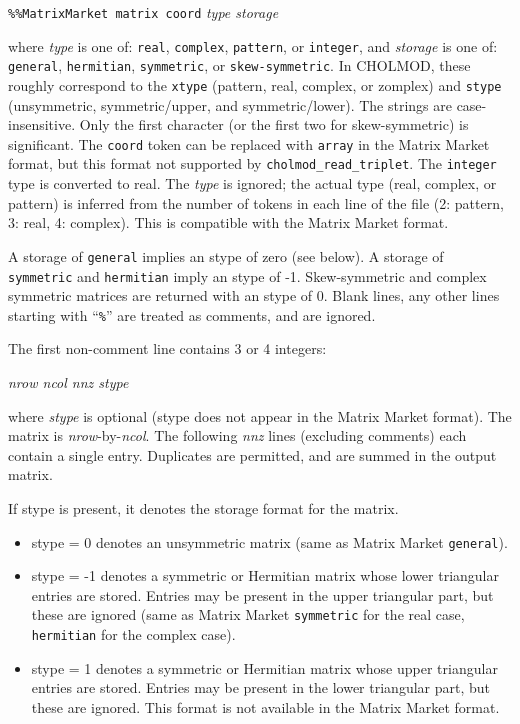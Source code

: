 \documentclass[11pt]{article}
\begin{document}
        {\tt \%\%MatrixMarket matrix coord} {\em type storage}

\vspace{0.1in}
\noindent
where {\em type} is one of: {\tt real}, {\tt complex}, {\tt pattern},
or {\tt integer}, and {\em storage} is one of: {\tt general}, {\tt hermitian},
{\tt symmetric}, or {\tt skew-symmetric}.
In CHOLMOD, these roughly correspond to the {\tt xtype}
(pattern, real, complex, or zomplex) and {\tt stype}
(unsymmetric, symmetric/upper, and symmetric/lower).
The strings are case-insensitive.  Only the first character (or the
first two for skew-symmetric) is significant.
The {\tt coord} token can be replaced with {\tt array} in the Matrix Market format, but
this format not supported by {\tt cholmod\_read\_triplet}.
The {\tt integer} type is converted to real.
The {\em type} is ignored; the actual type (real, complex, or pattern) is
inferred from the number of tokens in each line of the file (2: pattern,
3: real, 4: complex).  This is compatible with the Matrix Market format.

A storage of {\tt general} implies an stype of zero
(see below).  A storage of {\tt symmetric} and {\tt hermitian} imply an stype of -1.
Skew-symmetric and complex symmetric matrices are returned with an stype of 0.
Blank lines, any other lines starting with ``{\tt \%}'' are treated as comments, and are ignored.

The first non-comment line contains 3 or 4 integers:
\vspace{0.1in}

	{\em nrow ncol nnz stype}

\vspace{0.1in}
\noindent
where {\em stype} is optional (stype does not appear in the Matrix Market format).
The matrix is {\em nrow}-by-{\em ncol}.  The following {\em nnz} lines (excluding comments)
each contain a single entry.  Duplicates are permitted, and are summed in
the output matrix.

If stype is present, it denotes the storage format for the matrix.
\begin{itemize}
\item stype = 0 denotes an unsymmetric matrix (same as Matrix Market {\tt general}).
\item stype = -1 denotes a symmetric or Hermitian matrix whose lower triangular 
	entries are stored.  Entries may be present in the upper triangular
	part, but these are ignored (same as Matrix Market {\tt symmetric}
	for the real case, {\tt hermitian} for the complex case).
\item stype = 1 denotes a symmetric or Hermitian matrix whose upper triangular 
	entries are stored.  Entries may be present in the lower triangular
	part, but these are ignored.  This format is not available in the Matrix
	Market format.
\end{itemize}
\end{document}

